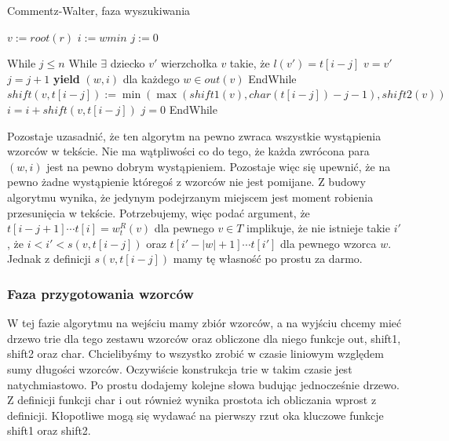 \begin{algorithm}
\caption{Commentz-Walter, faza wyszukiwania}\label{euclid}
\begin{algorithmic}
 
\State $v := root(r)$ 
\State $i := wmin$ 
\State $j := 0$ 

\State While{ $j \leq n$ }
    \State While {$\exists$ dziecko $v'$ wierzchołka $v$ takie, że $l(v')=t[i-j]$} 
        \State $v = v'$
        \State $j = j + 1$
        \State \textbf{yield} $(w, i)$ dla każdego $w \in out(v)$
    \State EndWhile
\State $shift(v, t[i-j]) := \min(\max(shift1(v), char(t[i-j])-j-1), shift2(v))$
\State $i = i + shift(v, t[i-j])$ 
\State $j = 0$
\State EndWhile
\EndProcedure
\end{algorithmic}
\end{algorithm}

Pozostaje uzasadnić, że ten algorytm na pewno zwraca wszystkie wystąpienia wzorców w tekście. Nie ma wątpliwości co do tego, że każda zwrócona para $(w, i)$ jest na pewno dobrym wystąpieniem. Pozostaje więc się upewnić, że na pewno żadne wystąpienie któregoś z wzorców nie jest pomijane. Z budowy algorytmu wynika, że jedynym podejrzanym miejscem jest moment robienia przesunięcia w tekście. Potrzebujemy, więc podać argument, że $t[i-j+1]\cdots t[i] = w_t^R(v)$ dla pewnego $v \in T$ implikuje, że nie istnieje takie $i'$, że $i < i' < s(v, t[i-j])$ oraz $t[i'-|w|+1]\cdots t[i']$ dla pewnego wzorca $w$. Jednak z definicji $s(v, t[i-j])$ mamy tę własność po prostu za darmo.

\subsubsection{Faza przygotowania wzorców}
W tej fazie algorytmu na wejściu mamy zbiór wzorców, a na wyjściu chcemy mieć drzewo trie dla tego zestawu wzorców oraz obliczone dla niego funkcje out, shift1, shift2 oraz char. Chcielibyśmy to wszystko zrobić w czasie liniowym względem sumy długości wzorców. Oczywiście konstrukcja trie w takim czasie jest natychmiastowo. Po prostu dodajemy kolejne słowa budując jednocześnie drzewo. Z definicji funkcji char i out również wynika prostota ich obliczania wprost z definicji. Kłopotliwe mogą się wydawać na pierwszy rzut oka kluczowe funkcje shift1 oraz shift2.

